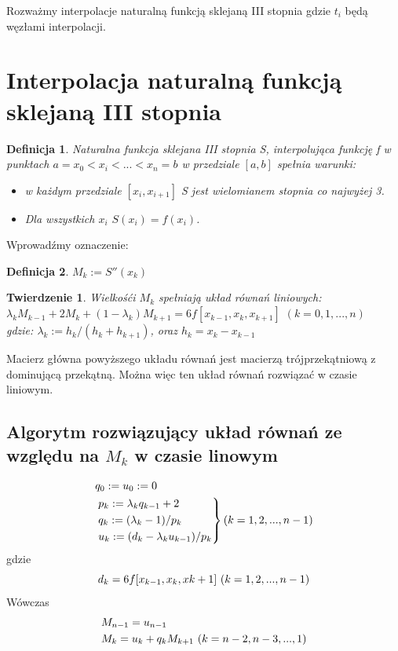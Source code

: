 \documentclass{article}
\newtheorem{defi}{Definicja}
\newtheorem{twr}{Twierdzenie}
\begin{document}
Rozważmy interpolacje naturalną funkcją sklejaną III stopnia gdzie $t_i$ będą węzłami interpolacji.

\section{Interpolacja naturalną funkcją sklejaną III stopnia}

\begin{defi}
	Naturalna funkcja sklejana III stopnia S, interpolująca funkcję f w punktach $a = x_0 < x_i <...<x_n = b$ w przedziale $[a,b]$ spełnia warunki:
	
	\begin{itemize}
		\item w każdym przedziale $[x_i,x_{i+1}]$ S jest wielomianem stopnia co najwyżej 3.
		\item Dla wszystkich $x_i$ $S(x_i) = f(x_i)$.
	\end{itemize}
	
\end{defi}

\noindent Wprowadźmy oznaczenie:

\begin{defi}
	$M_k := S''(x_k)$
\end{defi}

\begin{twr}
	Wielkośći $M_k$ spełniają układ równań liniowych:\\
	$\lambda_k M_{k-1} + 2M_k + (1-\lambda_k) M_{k+1} = 6f[x_{k-1},x_k,x_{k+1}]$ \hfill $(k=0,1,...,n)$\\
	gdzie: $\lambda_k := h_k / ( h_k + h_{k+1})$, oraz $h_k = x_k - x_{k-1}$
\end{twr}
	
Macierz główna powyższego układu równań jest macierzą trójprzekątniową z dominującą przekątną. Można więc ten układ równań rozwiązać w czasie liniowym.

\subsection{Algorytm rozwiązujący układ równań ze względu na $M_k$ w czasie linowym}

\begin{align}
	&q_0 := u_0 := 0 \\
	\notag
	&\begin{rcases}
		p_k := \lambda_k q_{k-1} + 2 \\ \notag
		q_k := (\lambda_k - 1) / p_k \\ \notag
		u_k := (d_k -\lambda_k u_{k-1}) / p_k
	\end{rcases}
	\text{$(k=1,2,...,n-1)$}
\end{align}
gdzie
\begin{equation*}
	d_k = 6 f[x_{k-1},x_k,x{k+1}] \textnormal{ } (k=1,2,...,n-1)
\end{equation*}
Wówczas
\begin{align*}
	&M_{n-1} = u_{n-1} \\ \notag
	&M_k = u_k + q_k M_{k+1} \textnormal{ } (k =n-2,n-3,...,1 )
\end{align*}
\\
\end{document}
